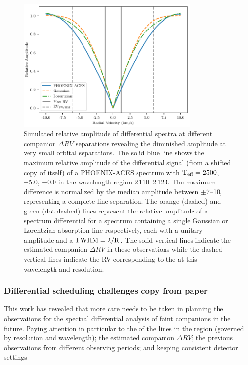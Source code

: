 \begin{figure}
    \centering
    \includegraphics[width=0.8\textwidth]{figures/direct-recovery/rv_diff_final.pdf}
    \caption[Simulated relative amplitude of differntial spectrum.]{Simulated relative amplitude of differential spectra at different companion \(\Delta RV\) separations revealing the diminished amplitude at very small orbital separations.
    The solid blue line shows the maximum relative amplitude of the differential signal (from a shifted copy of itself) of a {PHOENIX-ACES} spectrum with \(\textrm{T}_{\mathrm{eff}}{}=2500\)\K{}, \logg{}=5.0, \feh{}=0.0 in the wavelength region 2\,110--2\,123\nm{}.
    The maximum difference is normalized by the median amplitude between \(\pm7\)--10\kmps{}, representing a complete line separation.
    The orange (dashed) and green (dot-dashed) lines represent the relative amplitude of a spectrum differential for a spectrum containing a single Gaussian or Lorentzian absorption line respectively, each with a unitary amplitude and a \(\rm {\textrm{FWHM}} = \lambda / R\).
    The solid vertical lines indicate the estimated companion \(\Delta {RV}\) in these observations while the dashed vertical lines indicate the {RV} corresponding to the {\fwhm} at this wavelength and resolution.}
    \label{fig:diff_amp}
\end{figure}








\subsubsection{Differential scheduling challenges {copy from paper}}
\label{subsubsec:differential-schedualing}
This work has revealed that more care needs to be taken in planning the observations for the spectral differential analysis of faint companions in the future.
Paying attention in particular to the {\fwhm} of the lines in the region (governed by resolution and wavelength); the estimated companion \(\Delta {RV}\); the previous observations from different observing periods; and keeping consistent detector settings.

